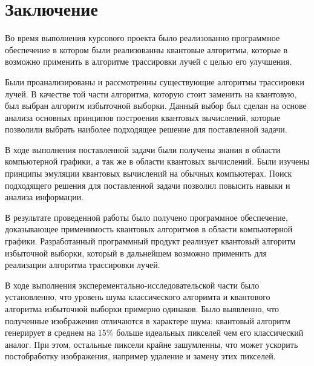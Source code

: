 \chapter*{Заключение}

Во время выполнения курсового проекта было реализованно программное обеспечение в котором были реализованны квантовые алгоритмы, которые в возможно применить в алгоритме трассировки лучей с целью его улучшения.

Были проанализированы и рассмотренны существующие алгоритмы трассировки лучей. В качестве той части алгоритма, которую стоит заменить на квантовую, был выбран алгоритм избыточной выборки. Данный выбор был сделан на основе анализа основных принципов построения квантовых вычислений, которые позволили выбрать наиболее подходящее решение для поставленной задачи.

В ходе выполнения поставленной задачи были получены знания в области компьютерной графики, а так же в области квантовых вычислений. Были изучены принципы эмуляции квантовых вычислений на обычных компьютерах. Поиск подходящего решения для поставленной задачи позволил повысить навыки и анализа информации.

В результате проведенной работы было получено программное обеспечение, доказывающее применимость квантовых алгоритмов в области компьютерной графики. Разработанный программный продукт реализует квантовый алгоритм избыточной выборки, который в дальнейшем возможно применить для реализации алгоритма трассировки лучей.

В ходе выполнения эксперементально-исследовательской части было установленно, что уровень шума классического алгоримта и квантового алгоритма избыточной выборки примерно одинаков. Было выявленно, что полученные изображения отличаются в характере шума: квантовый алгоритм генерирует в среднем на 15\% больше идеальных пикселей чем его классический аналог. При этом, остальные пиксели крайне зашумленны, что может ускорить постобработку изображения, например удаление и замену этих пикселей.

